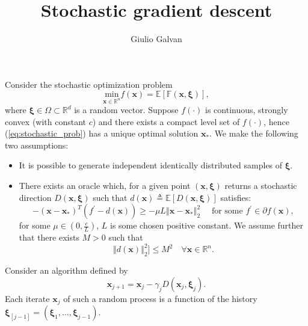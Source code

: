\documentclass{article}
\title{Stochastic gradient descent}
\author{Giulio Galvan}
\renewcommand{\vec}[1]{\boldsymbol{#1}}
\newcommand{\norm}[1]{\left\Vert #1 \right\Vert}
\newcommand{\defeq}{\triangleq}
\begin{document}
	\maketitle
\noindent
Consider the stochastic optimization problem 
\begin{equation}
	\underset{\vec{x} \in \mathbb{R}^n}{\text{min}} f(\vec{x}) = \mathbb{E[F(\vec{x}, \vec{\xi})]},
	\label{eq:stochastic_prob}
\end{equation}
where $\vec{\xi} \in \Omega \subset \mathbb{R}^d$ is a random vector.
Suppose $f(\cdot)$ is continuous, strongly convex (with constant $c$) and there exists a compact level set of $f(\cdot)$, hence (\ref{eq:stochastic_prob}) has a unique optimal solution $\vec{x}_*$. We make the following two assumptions:
\begin{itemize}
	\item	It is possible to generate independent identically distributed samples of $\vec{\xi}$.
	\item There exists an oracle which, for a given point $(\vec{x}, \vec{\xi})$ returns a stochastic direction $D(\vec{x}, \vec{\xi})$ such that $d(\vec{x})\defeq\mathbb{E}[D(\vec{x}, \vec{\xi})]$ satisfies:
	\begin{equation}
	-(\vec{x}-\vec{x}_*)^T (f^{\prime} -d(\vec{x})) \geq -\mu L \norm{\vec{x}-\vec{x}_*}^2_2\quad \text{ for some } f^\prime \in \partial f(\vec{x}),
	\label{eq:angular_condition}
	\end{equation}
	for some $\mu \in (0,\frac{c}{L}) $, $L$ is some chosen positive constant. We assume further that there exists $M>0$ such that
	\begin{equation}
		\norm{d(\vec{x})}^2_2]\leq M^2 \quad \forall \vec{x} \in \mathbb{R}^n.
		\label{eq:gradient_bound}
	\end{equation}
\end{itemize}
Consider an algorithm defined by
\begin{equation}
	\vec{x}_{j+1} = \vec{x}_j -\gamma_j D(\vec{x}_j,\vec{\xi}_j).
	\label{eq:stochastic_algo}
\end{equation}
Each iterate $\vec{x}_j$ of such a random process is a function of the history $\vec{\xi}_{[j-1]}=(\vec{\xi}_1,\dots, \vec{\xi}_{j-1})$.
\end{document}
